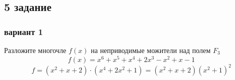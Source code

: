 \subsection{5 задание}

\subsubsection{вариант 1}
Разложите многочле $f\left(x\right)$ на неприводимые можители над полем $F_3$\\ 
$$f\left(x\right) = x^6+x^5+x^4+2x^3-x^2+x-1$$
$$f = \left(x^2+x+2\right)\cdot\left(x^4+2x^2+1\right)= \left(x^2+x+2\right)\left(x^2+1\right)^2$$

$$$$


